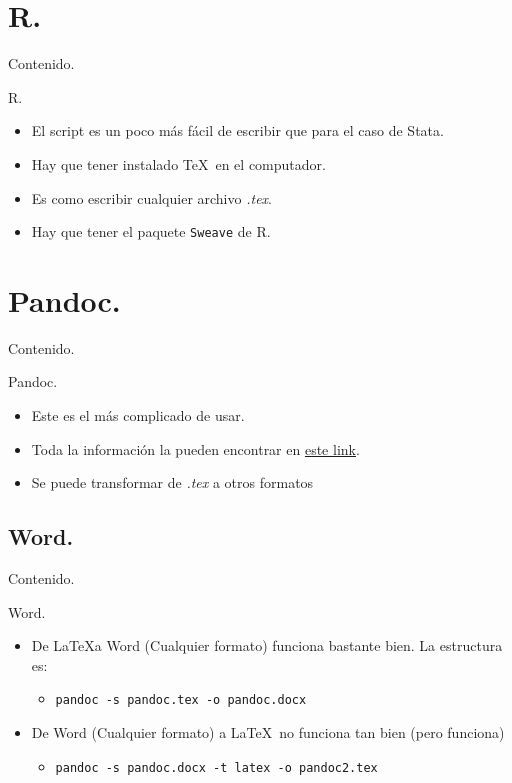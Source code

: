 \documentclass[dvipsnames,xcolor=x11names]{beamer}
\theoremstyle{plain}
\theoremstyle{definition}
\begin{document}
\section{R.}
\begin{frame}{Contenido.}
  \tableofcontents[currentsection]
\end{frame}
\begin{frame}{R.}
    \begin{itemize}[<+->]
        \item El script es un poco más fácil de escribir que para el caso de Stata.
        \item Hay que tener instalado \TeX\ en el computador.
        \item Es como escribir cualquier archivo \textit{.tex}.
        \item Hay que tener el paquete \texttt{Sweave} de R.
    \end{itemize}
\end{frame}
\section{Pandoc.}
\begin{frame}{Contenido.}
  \tableofcontents[currentsection]
\end{frame}
\begin{frame}{Pandoc.}
    \begin{itemize}
        \item Este es el más complicado de usar.
        \item Toda la información la pueden encontrar en \href{https://pandoc.org}{\textcolor{colorClase}{este link}}.
        \item Se puede transformar de \textit{.tex} a otros formatos
    \end{itemize}
\end{frame}
\subsection{Word.}
\begin{frame}{Contenido.}
\end{frame}
\begin{frame}[fragile]{Word.}
    \begin{itemize}
        \item De \LaTeX a Word (Cualquier formato) funciona bastante bien. La estructura es:
        \begin{itemize}
            \item \verb!pandoc -s pandoc.tex -o pandoc.docx!
        \end{itemize}
        
        \item De Word (Cualquier formato) a \LaTeX\ no funciona tan bien (pero funciona)
        
        \begin{itemize}
            \item \verb!pandoc -s pandoc.docx -t latex -o pandoc2.tex!
        \end{itemize}
    \end{itemize}
\end{frame}
\end{document}

